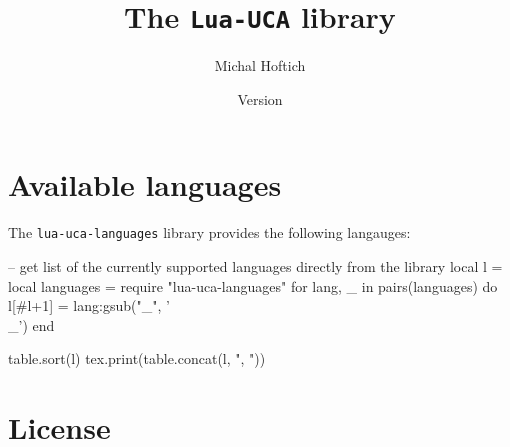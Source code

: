\documentclass{ltxdoc}
\title{The \texttt{Lua-UCA} library}
\author{Michal Hoftich\authormail{michal.h21@gmail.com}}
\date{Version \version\\\gitdate}
\begin{document}
\maketitle
\tableofcontents
{}

\section{Available languages}

The \texttt{lua-uca-languages} library provides the following langauges:
\bgroup\ttfamily
\begin{luacode*}
-- get list of the currently supported languages directly from the library
local l = {}
local languages = require "lua-uca-languages"
for lang, _ in pairs(languages) do
l[#l+1] = lang:gsub("_", '\\_')
end

table.sort(l)
tex.print(table.concat(l, ", "))
\end{luacode*}
\egroup

\section{License}
\end{document}
